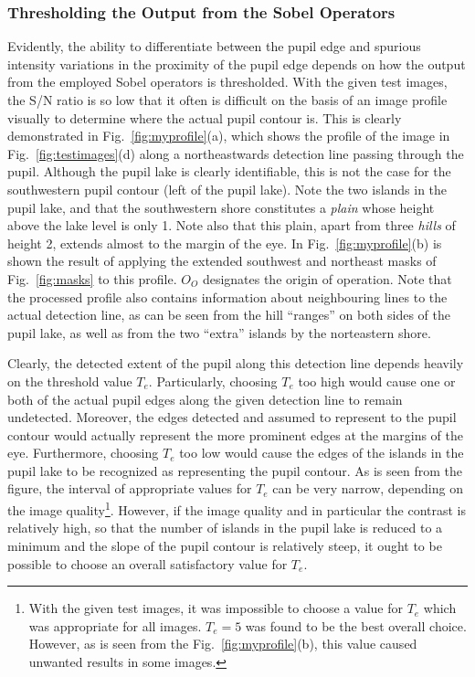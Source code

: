\subsubsection{Thresholding the Output from the Sobel Operators}


Evidently, the ability to differentiate between the pupil edge and
spurious intensity variations in the proximity of the pupil edge
depends on how the output from the employed Sobel operators is
thresholded.  With the given test images, the S/N ratio is so low that
it often is difficult on the basis of an image profile visually to
determine where the actual pupil contour is.  This is clearly
demonstrated in Fig.~\ref{fig:myprofile}(a), which shows the profile
of the image in Fig.~\ref{fig:testimages}(d) along a northeastwards
detection line passing through the pupil.  Although the pupil lake is
clearly identifiable, this is not the case for the southwestern pupil
contour (left of the pupil lake).  Note the two islands in the pupil
lake, and that the southwestern shore constitutes a {\em plain\/}
whose height above the lake level is only 1.  Note also that this
plain, apart from three {\em hills\/} of height 2, extends almost to
the margin of the eye.  In Fig.~\ref{fig:myprofile}(b) is shown the
result of applying the extended southwest and northeast masks of
Fig.~\ref{fig:masks} to this profile.  $O_{O}$ designates the origin
of operation.  Note that the processed profile also contains
information about neighbouring lines to the actual detection line, as
can be seen from the hill ``ranges'' on both sides of the pupil lake,
as well as from the two ``extra'' islands by the norteastern shore.

Clearly, the detected extent of the pupil along this detection line
depends heavily on the threshold value $T_{e}$.  Particularly,
choosing $T_{e}$ too high would cause one or both of the actual pupil
edges along the given detection line to remain undetected.  Moreover,
the edges detected and assumed to represent to the pupil contour would
actually represent the more prominent edges at the margins of the eye.
Furthermore, choosing $T_{e}$ too low would cause the edges of the
islands in the pupil lake to be recognized as representing the pupil
contour.  As is seen from the figure, the interval of appropriate
values for $T_{e}$ can be very narrow, depending on the image
quality\footnote{With the given test images, it was impossible to
  choose a value for $T_{e}$ which was appropriate for all images.
  $T_{e}=5$ was found to be the best overall choice.  However, as is
  seen from the Fig.~\ref{fig:myprofile}(b), this value caused
  unwanted results in some images.}.  However, if the image quality
and in particular the contrast is relatively high, so that the number
of islands in the pupil lake is reduced to a minimum and the slope of
the pupil contour is relatively steep, it ought to be possible to
choose an overall satisfactory value for $T_{e}$.

